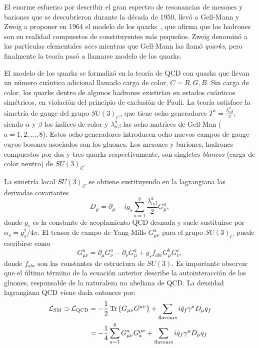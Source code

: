 El enorme esfuerzo por describir el gran espectro de resonancias de mesones y bariones que se descubrieron durante la década de 1950, llevó a Gell-Mann y Zweig a proponer en 1964 el modelo de los quarks~\cite{Gellmann-1964,Zweig-1964_1,Zweig-1964_2}, que afirma que los hadrones son en realidad compuestos de constituyentes más pequeños. Zweig denominó a las partículas elementales \textit{aces} mientras que Gell-Mann las llamó \textit{quarks}, pero finalmente la teoría pasó a llamarse modelo de los quarks.

El modelo de los quarks se formalizó en la teoría de \ac{QCD} con quarks que llevan un número cuántico adicional llamado carga de color, \(C=R,G,B\). Sin carga de color, los quarks dentro de algunos hadrones existirían en estados cuánticos simétricos, en violación del principio de exclusión de Pauli.
La teoría satisface la simetría de gauge del grupo \(SU(3)_C\), que tiene ocho generadores \(T^a = \frac{\lambda_{\alpha\beta}^a}{2}\), siendo \(\alpha\) y \(\beta\) los índices de color y \(\lambda_{\alpha\beta}^a\) las ocho matrices de Gell-Man (\(a=1,2,\dots,8\)). Estos ocho generadores introducen ocho nuevos campos de gauge cuyos bosones asociados son los gluones.
Los mesones y bariones, hadrones compuestos por dos y tres quarks respectivamente, son singletes \textit{blancos} (carga de color neutro) de \(SU(3)_C\).

La simetría local \(SU(3)_C\) se obtiene sustituyendo en la lagrangiana las derivadas covariantes
\begin{equation*}
    D_{\mu} = \partial_{\mu} - i g_s \sum_{a=1}^{8} \frac{\lambda_{\alpha\beta}^a}{2} G_{\mu}^a,
\end{equation*}
donde \(g_s\) es la constante de acoplamiento \ac{QCD} desnuda y suele sustituirse por \(\alpha_s = g_s^2 / 4\pi\). El tensor de campo de Yang-Mills \(G_{\mu\nu}^a\) para el grupo \(SU(3)_C\) puede escribirse como
\begin{equation*}
    G_{\mu\nu}^a = \partial_{\mu} G_{\nu}^a - \partial_{\nu} G_{\mu}^a + g_s f_{abc} G_{\mu}^b G_{\nu}^c,
\end{equation*}
donde \(f_{abc}\) son las constantes de estructura de \(SU(3)\). Es importante observar que el último término de la ecuación anterior describe la autointeracción de los gluones, responsable de la naturaleza no abeliana de \ac{QCD}.
La densidad lagrangiana \ac{QCD} viene dada entonces por:
\begin{align*}
    \mathcal{L}_{\text{SM}} \supset \mathcal{L}_{\text{QCD}}
    &=
        -\frac{1}{2} \Tr\left\{G_{\mu\nu}G^{\mu\nu}\right\}
        + 
        \sum_{\text{flavours}} i \bar{q}_f \gamma^{\mu} D_{\mu} q_f\\
    &=
        -\frac{1}{4} \sum_{a=1}^{8} G_{\mu\nu}^a G^{\mu\nu}_a
        + 
        \sum_{\text{flavours}} i \bar{q}_f \gamma^{\mu} D_{\mu} q_f
\end{align*}

